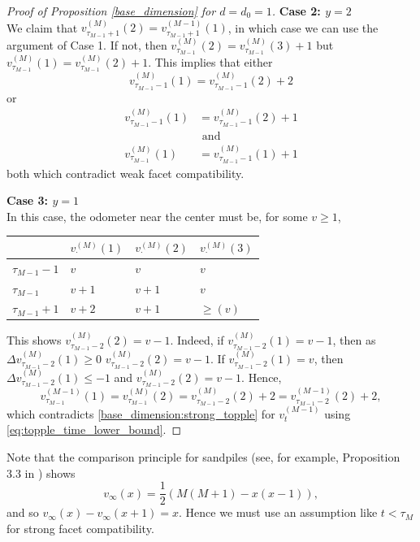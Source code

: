 \documentclass[12pt]{amsart}
\begin{document}
\begin{proof}[Proof of Proposition \ref{base_dimension} for $d=d_0 = 1$]
		
		{\bf Case 2: $y = 2$} \\
		We claim that $v_{\tau_{M-1}+1}^{(M)}(2) = v_{\tau_{M-1}+1}^{(M-1)}(1)$, in which 
		case we can use the argument of Case 1. If not, then $v_{\tau_{M-1}}^{(M)}(2) = v_{\tau_{M-1}}^{(M)}(3)+1$
		but $v_{\tau_{M-1}}^{(M)}(1) = v_{\tau_{M-1}}^{(M)}(2)+1$. This implies that either 
		\[
		v_{\tau_{M-1}-1}^{(M)}(1) = v_{\tau_{M-1}-1}^{(M)}(2)+2
		\]
		or
		\begin{align*}
		v_{\tau_{M-1}-1}^{(M)}(1) &= v_{\tau_{M-1}-1}^{(M)}(2)+1 \\
		 &\mbox{ and }  \\  
		v_{\tau_{M-1}}^{(M)}(1) &= v_{\tau_{M-1}-1}^{(M)}(1)+1
		\end{align*}
		both which contradict weak facet compatibility. 


		{\bf Case 3: $y = 1$} \\
		In this case, the odometer near the center must be, for some $v \geq 1$,
			\begin{center}
			\begin{tabular}{l | l | l | l }
				& $v_{\cdot}^{(M)}(1)$ & $v_{\cdot}^{(M)}(2)$ & $v_{\cdot}^{(M)}(3)$ \\  \hline
				$\tau_{M-1}-1$ & $v$ & $v$ & $v$    \\
				$\tau_{M-1}$  & $v+1$ & $v+1$  & $v$  \\   
				$\tau_{M-1}+1$  & $v+2$ & $v+1$ & $\geq (v)$
			\end{tabular}
		\end{center}
		This shows $v^{(M)}_{\tau_{M-1}-2}(2) = v-1$. Indeed, 
		if $v^{(M)}_{\tau_{M-1}-2}(1) = v-1$, then as $\Delta v^{(M)}_{\tau_{M-1}-2}(1) \geq 0$
		 $v^{(M)}_{\tau_{M-1}-2}(2) = v-1$. If $v^{(M)}_{\tau_{M-1}-2}(1) = v$, then $\Delta v^{(M)}_{\tau_{M-1}-2}(1) \leq -1$ and $v^{(M)}_{\tau_{M-1}-2}(2) = v-1$. Hence, 
		 \[
		 v^{(M-1)}_{\tau_{M-1}}(1) = v^{(M)}_{\tau_{M-1}}(2) = v^{(M)}_{\tau_{M-1}-2}(2)+2= v^{(M-1)}_{\tau_{M-1}-2}(2)+2,
		 \]
		 which contradicts \eqref{base_dimension:strong_topple} for $v_t^{(M-1)}$ using \eqref{eq:topple_time_lower_bound}.


	\end{proof}
	
	Note that the comparison principle for sandpiles (see, for example, Proposition 3.3 in \cite{bou2021convergence}) shows
	\[
	v_{\infty}(x) = \frac{1}{2} \left( M(M+1) - x(x-1) \right), 
	\]
	and so $v_{\infty}(x) - v_\infty(x+1) = x$. Hence we must use an assumption like $t < \tau_M$ for strong facet compatibility.
\end{document}
